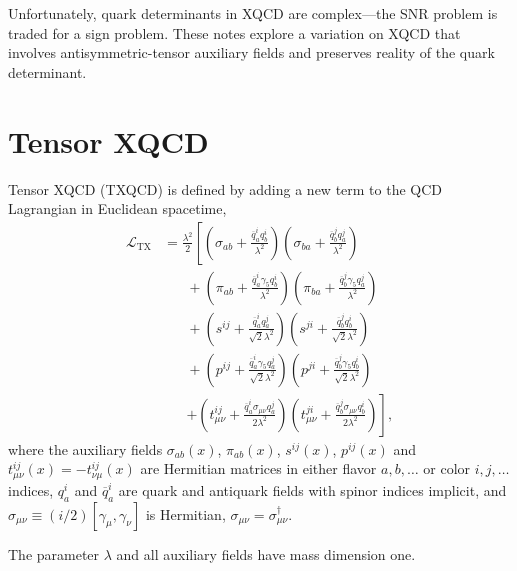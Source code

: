 \documentclass[%
    twocolumn,
superscriptaddress,
preprintnumbers,
nofootinbib,
 amsmath,amssymb,
 aps,
 prd,
 floatfix,
]{revtex4-2}
\newcommand{\tx}[0]{\text{TX}}
\begin{document}
Unfortunately, quark determinants in XQCD are complex---the SNR problem is traded for a sign problem. These notes explore a variation on XQCD that involves antisymmetric-tensor auxiliary fields and preserves reality of the quark determinant.

\section{Tensor XQCD}

Tensor XQCD (TXQCD) is defined by adding a new term to the QCD Lagrangian in Euclidean spacetime,
\begin{equation}\label{eq:LTX}
\begin{split}
   \mathcal{L}_{\tx} &= \frac{\lambda^2}{2} \left[ \left(\sigma_{ab} + \frac{ \overline{q}^i_a q^i_b }{\lambda^2} \right)\left(\sigma_{ba} + \frac{ \overline{q}^j_b q^j_a }{\lambda^2} \right) \right. \\
   &\hspace{20pt} + \left(\pi_{ab} + \frac{ \overline{q}^i_a \gamma_5 q^i_b }{\lambda^2} \right)\left(\pi_{ba} + \frac{ \overline{q}^j_b \gamma_5 q^j_a }{ \lambda^2} \right) \\
   &\hspace{20pt} + \left(s^{ij} + \frac{ \overline{q}^i_a q^j_a }{\sqrt{2} \lambda^2} \right)\left(s^{ji} + \frac{ \overline{q}^j_b q^i_b }{\sqrt{2} \lambda^2} \right) \\
    &\hspace{20pt} + \left(p^{ij} + \frac{ \overline{q}^i_a \gamma_5 q^j_a }{\sqrt{2} \lambda^2} \right)\left(p^{ji} + \frac{ \overline{q}^j_b \gamma_5 q^i_b }{\sqrt{2} \lambda^2} \right) \\
    &\hspace{20pt} \left. + \left(t_{\mu\nu}^{ij} + \frac{ \overline{q}^i_a \sigma_{\mu\nu} q^j_a }{2 \lambda^2} \right)\left(t_{\mu\nu}^{ji} + \frac{ \overline{q}^j_b \sigma_{\mu\nu} q^i_b }{2 \lambda^2} \right) \right],
   \end{split}
\end{equation}
where the auxiliary fields $\sigma_{ab}(x)$, $\pi_{ab}(x)$, $s^{ij}(x)$, $p^{ij}(x)$ and $t^{ij}_{\mu\nu}(x) = -t^{ij}_{\nu\mu}(x)$ are Hermitian matrices in either flavor $a,b,\ldots$ or color $i,j,\ldots$ indices, $q_a^i$ and $\overline{q}_a^i$  are quark and antiquark fields with spinor indices implicit, and $\sigma_{\mu\nu} \equiv (i/2)[\gamma_{\mu},\gamma_{\nu}]$  is Hermitian, $\sigma_{\mu\nu} = \sigma_{\mu\nu}^\dagger$.

The parameter $\lambda$ and all auxiliary fields have mass dimension one.
\end{document}
